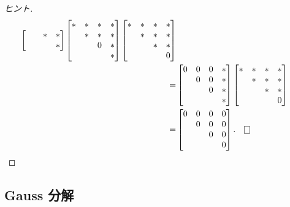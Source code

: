 \documentclass[12pt,twoside]{jarticle}
\begin{document}
\begin{proof}[ヒント]
\begin{align*}
\begin{bmatrix}
        &   & * & * \\
        &   &   & * \\
    \end{bmatrix}
    \begin{bmatrix}
      * & * & * & * \\
        & * & * & * \\
        &   & 0 & * \\
        &   &   & * \\
    \end{bmatrix}
    \begin{bmatrix}
      * & * & * & * \\
        & * & * & * \\
        &   & * & * \\
        &   &   & 0 \\
    \end{bmatrix}
    \\
    = &
    \begin{bmatrix}
      0 & 0 & 0 & * \\
        & 0 & 0 & * \\
        &   & 0 & * \\
        &   &   & * \\
    \end{bmatrix}
    \begin{bmatrix}
      * & * & * & * \\
        & * & * & * \\
        &   & * & * \\
        &   &   & 0 \\
    \end{bmatrix}
    \\
    = &
    \begin{bmatrix}
      0 & 0 & 0 & 0 \\
        & 0 & 0 & 0 \\
        &   & 0 & 0 \\
        &   &   & 0 \\
    \end{bmatrix}.
    \qed
  \end{align*}
\end{proof}


\subsection{Gauss 分解}
\label{sec:Gauss-decomp}
\end{document}
